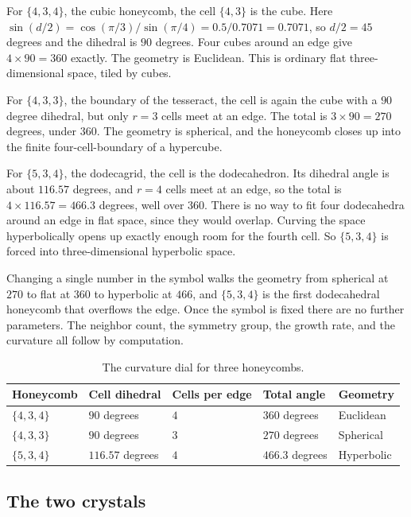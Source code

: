 For $\{4,3,4\}$, the cubic honeycomb, the cell $\{4,3\}$ is the cube. Here
$\sin(d/2) = \cos(\pi/3)/\sin(\pi/4) = 0.5/0.7071 = 0.7071$, so $d/2 = 45$ degrees and the dihedral is $90$
degrees. Four cubes around an edge give $4 \times 90 = 360$ exactly. The geometry is Euclidean. This is
ordinary flat three-dimensional space, tiled by cubes.

For $\{4,3,3\}$, the boundary of the tesseract, the cell is again the cube with a $90$ degree dihedral, but
only $r = 3$ cells meet at an edge. The total is $3 \times 90 = 270$ degrees, under $360$. The geometry is
spherical, and the honeycomb closes up into the finite four-cell-boundary of a hypercube.

For $\{5,3,4\}$, the dodecagrid, the cell is the dodecahedron. Its dihedral angle is about $116.57$ degrees,
and $r = 4$ cells meet at an edge, so the total is $4 \times 116.57 = 466.3$ degrees, well over $360$. There
is no way to fit four dodecahedra around an edge in flat space, since they would overlap. Curving the space
hyperbolically opens up exactly enough room for the fourth cell. So $\{5,3,4\}$ is forced into
three-dimensional hyperbolic space.

Changing a single number in the symbol walks the geometry from spherical at $270$ to flat at $360$ to
hyperbolic at $466$, and $\{5,3,4\}$ is the first dodecahedral honeycomb that overflows the edge. Once the
symbol is fixed there are no further parameters. The neighbor count, the symmetry group, the growth rate,
and the curvature all follow by computation.

\begin{table}[h]
\centering
\begin{tabular}{lllll}
\toprule
Honeycomb & Cell dihedral & Cells per edge & Total angle & Geometry \\
\midrule
$\{4,3,4\}$ & $90$ degrees & $4$ & $360$ degrees & Euclidean \\
$\{4,3,3\}$ & $90$ degrees & $3$ & $270$ degrees & Spherical \\
$\{5,3,4\}$ & $116.57$ degrees & $4$ & $466.3$ degrees & Hyperbolic \\
\bottomrule
\end{tabular}
\caption{The curvature dial for three honeycombs.}
\label{tab:curvature-dial}
\end{table}

\subsection{The two crystals}

